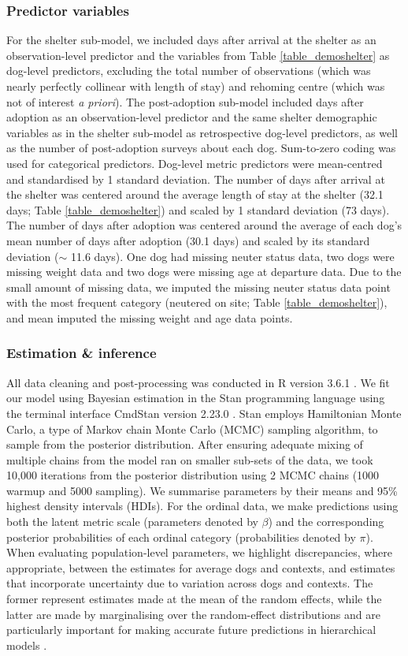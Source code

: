 \documentclass[fleqn,10pt]{wlscirep}
\begin{document}
\subsubsection*{Predictor variables}
For the shelter sub-model, we included days after arrival at the shelter as an observation-level predictor and the variables from Table \ref{table_demoshelter} as dog-level predictors, excluding the total number of observations (which was nearly perfectly collinear with length of stay) and rehoming centre (which was not of interest \textit{a priori}). The post-adoption sub-model included days after adoption as an observation-level predictor and the same shelter demographic variables as in the shelter sub-model as retrospective dog-level predictors, as well as the number of post-adoption surveys about each dog. Sum-to-zero coding was used for categorical predictors. Dog-level metric predictors were mean-centred and standardised by 1 standard deviation. The number of days after arrival at the shelter was centered around the average length of stay at the shelter (32.1 days; Table \ref{table_demoshelter}) and scaled by 1 standard deviation (73 days). The number of days after adoption was centered around the average of each dog's mean number of days after adoption (30.1 days) and scaled by its standard deviation ($\sim$ 11.6 days). One dog had missing neuter status data, two dogs were missing weight data and two dogs were missing age at departure data. Due to the small amount of missing data, we imputed the missing neuter status data point with the most frequent category (neutered on site; Table \ref{table_demoshelter}), and mean imputed the missing weight and age data points.

\subsubsection*{Estimation \& inference}
All data cleaning and post-processing was conducted in R version 3.6.1 \cite{rcoreteam2019}. We fit our model using Bayesian estimation in the Stan programming language \cite{stan2018} using the terminal interface CmdStan version 2.23.0 \cite{cmdstan2018}. Stan employs Hamiltonian Monte Carlo, a type of Markov chain Monte Carlo (MCMC) sampling algorithm, to sample from the posterior distribution. After ensuring adequate mixing of multiple chains from the model ran on smaller sub-sets of the data, we took 10,000 iterations from the posterior distribution using 2 MCMC chains (1000 warmup and 5000 sampling). We summarise parameters by their means and 95\% highest density intervals (HDIs). For the ordinal data, we make predictions using both the latent metric scale (parameters denoted by $\beta$) and the corresponding posterior probabilities of each ordinal category (probabilities denoted by $\pi$). When evaluating population-level parameters, we highlight discrepancies, where appropriate, between the estimates for average dogs and contexts, and estimates that incorporate uncertainty due to variation across dogs and contexts. The former represent estimates made at the mean of the random effects, while the latter are made by marginalising over the random-effect distributions and are particularly important for making accurate future predictions in hierarchical models \cite{inthout2016,wang2019}.
\end{document}
